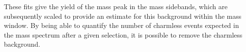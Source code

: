 These fits give the yield of the \Bm mass peak in the \Dz mass sidebands, which are subsequently scaled to provide an estimate for this background within the \Dz mass window. By being able to quantify the number of charmless events expected in the \Bm mass spectrum after a given selection, it is possible to remove the charmless background. 

%
